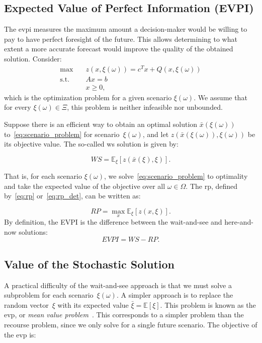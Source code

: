 \subsection{Expected Value of Perfect Information (EVPI)}

The \gls{evpi} measures the maximum amount a decision-maker would be willing to
pay to have perfect foresight of the future. This allows determining to what
extent a more accurate forecast would improve the quality of the obtained
solution. Consider:
\begin{align}
	\max \quad        & z(x, \xi(\omega)) = c^{T} x + Q(x, \xi(\omega)) \nonumber \\
	\text{s.t.} \quad & A x = b \nonumber                                         \\
	                  & x \geq 0,
	\label{eq:scenario_problem}
\end{align}
which is the optimization problem for a given scenario $\xi(\omega)$. We assume
that for every $\xi(\omega) \in \Xi$, this problem is neither infeasible nor
unbounded.

Suppose there is an efficient way to obtain an optimal solution
$\bar{x}(\xi(\omega))$ to~\eqref{eq:scenario_problem} for
scenario~$\xi(\omega)$, and let $z(\bar{x}(\xi(\omega)), \xi(\omega))$ be its
objective value. The so-called \gls{ws} solution is given by:

\begin{equation}
	WS = \mathbb{E}_{\xi} \left[ z(\bar{x}(\xi), \xi) \right].
	\label{eq:ws}
\end{equation}

That is, for each scenario $\xi(\omega)$, we solve~\eqref{eq:scenario_problem}
to optimality and take the expected value of the objective over all $\omega \in
	\Omega$. The \gls{rp}, defined by~\eqref{eq:rp}
or~\eqref{eq:rp_det}, can be written as:

\begin{equation}
	RP = \max_{x} \mathbb{E}_{\xi} \left[ z(x, \xi) \right].
	\label{eq:rp_exp}
\end{equation}
By definition, the EVPI is the difference between the wait-and-see and
here-and-now solutions:
\[
	EVPI = WS - RP.
\]

\subsection{Value of the Stochastic Solution}

A practical difficulty of the wait-and-see approach is that we must solve a
subproblem for each scenario~$\xi(\omega)$. A simpler approach is to replace the
random vector~$\xi$ with its expected value $\bar{\xi} = \mathbb{E}[\xi]$. This
problem is known as the \gls{evp}, or \emph{mean value
	problem}~\cite{birge:2011}. This corresponds to a simpler problem than the
recourse problem, since we only solve for a single future scenario. The
objective of the \gls{evp} is:

